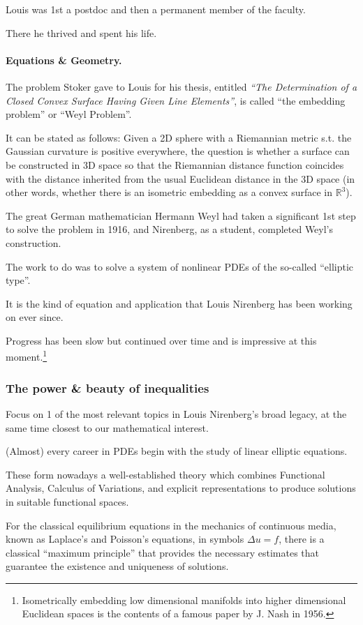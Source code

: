 \documentclass{article}
\begin{document}
Louis was 1st a postdoc and then a permanent member of the faculty.

There he thrived and spent his life.

\paragraph{Equations \& Geometry.} The problem Stoker gave to Louis for his thesis, entitled \textit{``The Determination of a Closed Convex Surface Having Given Line Elements''}, is called ``the embedding problem'' or ``Weyl Problem''.

It can be stated as follows: Given a 2D sphere with a Riemannian metric s.t. the Gaussian curvature is positive everywhere, the question is whether a surface can be constructed in 3D space so that the Riemannian distance function coincides with the distance inherited from the usual Euclidean distance in the 3D space (in other words, whether there is an isometric embedding as a convex surface in $\mathbb{R}^3$).

The great German mathematician Hermann Weyl had taken a significant 1st step to solve the problem in 1916, and Nirenberg, as a student, completed Weyl's construction.

The work to do was to solve a system of nonlinear PDEs of the so-called ``elliptic type''.

It is the kind of equation and application that Louis Nirenberg has been working on ever since.

Progress has been slow but continued over time and is impressive at this moment.\footnote{Isometrically embedding low dimensional manifolds into higher dimensional Euclidean spaces is the contents of a famous paper by J. Nash in 1956.}

\subsubsection{The power \& beauty of inequalities}
Focus on 1 of the most relevant topics in Louis Nirenberg's broad legacy, at the same time closest to our mathematical interest.

(Almost) every career in PDEs begin with the study of linear elliptic equations.

These form nowadays a well-established theory which combines Functional Analysis, Calculus of Variations, and explicit representations to produce solutions in suitable functional spaces.

For the classical equilibrium equations in the mechanics of continuous media, known as Laplace's and Poisson's equations, in symbols $\Delta u = f$, there is a classical ``maximum principle'' that provides the necessary estimates that guarantee the existence and uniqueness of solutions.
\end{document}
